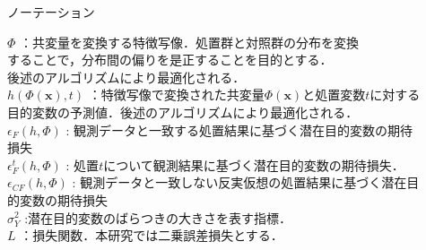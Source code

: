 \documentclass[dvipdfmx]{jreport}
\begin{document}
\begin{itembox}[l]{\large{ノーテーション}}
\begin{tabbing}
        \hspace{15pt} \raisebox{0.5ex}{\tiny $\bullet$} $\Phi$ \>：共変量を変換する特徴写像．処置群と対照群の分布を変換\\[0.5em]\>\hspace{6.5pt}することで，分布間の偏りを是正することを目的とする．\\[0.5em]\>\hspace{6.5pt}後述のアルゴリズムにより最適化される．\\[0.5em]
        \hspace{15pt} \raisebox{0.5ex}{\tiny $\bullet$} $h(\Phi(\boldsymbol{x}), t)$ \> ：特徴写像で変換された共変量$\Phi(\boldsymbol{x})$と処置変数$t$に対する\\[0.5em]\>\hspace{6.5pt}目的変数の予測値．後述のアルゴリズムにより最適化される．\\[0.5em]
        \hspace{15pt} \raisebox{0.5ex}{\tiny $\bullet$} $\epsilon_F(h, \Phi)$ \> : 観測データと一致する処置結果に基づく潜在目的変数の期待\\[0.5em]\>\hspace{6.5pt}損失\\[0.5em]
        \hspace{15pt} \raisebox{0.5ex}{\tiny $\bullet$} $\epsilon_F^{t}(h, \Phi)$ \> : 処置$t$について観測結果に基づく潜在目的変数の期待損失．\\[0.5em]
        \hspace{15pt} \raisebox{0.5ex}{\tiny $\bullet$} $\epsilon_{CF}(h, \Phi)$ \> : 観測データと一致しない反実仮想の処置結果に基づく潜在目\\[0.5em]\>\hspace{6.5pt}的変数の期待損失\\[0.5em]
        \hspace{15pt} \raisebox{0.5ex}{\tiny $\bullet$} $\sigma_Y^2$ \> :潜在目的変数のばらつきの大きさを表す指標．\\[0.5em]
        \hspace{15pt} \raisebox{0.5ex}{\tiny $\bullet$} $L$ \>：損失関数．本研究では二乗誤差損失とする． \\[0.5em]

\end{tabbing}
\end{itembox}
\end{document}
